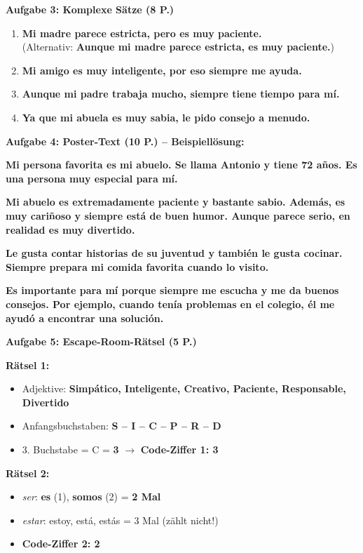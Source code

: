 \documentclass[11pt,a4paper]{article}
\newcommand{\lsg}[1]{\textcolor{loesung}{\textbf{#1}}}
\newcommand{\es}[1]{\textit{#1}}
\begin{document}
\begin{gruppeBbox}
\vspace{0.5em}

\textbf{Aufgabe 3: Komplexe Sätze (8 P.)}
\begin{enumerate}[label=\alph*), leftmargin=2em, nosep]
    \item \lsg{Mi madre parece estricta, pero es muy paciente.} \\
          (Alternativ: \lsg{Aunque mi madre parece estricta, es muy paciente.})
    \item \lsg{Mi amigo es muy inteligente, por eso siempre me ayuda.}
    \item \lsg{Aunque mi padre trabaja mucho, siempre tiene tiempo para mí.}
    \item \lsg{Ya que mi abuela es muy sabia, le pido consejo a menudo.}
\end{enumerate}

\vspace{0.5em}

\textbf{Aufgabe 4: Poster-Text (10 P.) -- Beispiellösung:}

\lsg{Mi persona favorita es mi abuelo. Se llama Antonio y tiene 72 años. Es una persona muy especial para mí.}

\lsg{Mi abuelo es extremadamente paciente y bastante sabio. Además, es muy cariñoso y siempre está de buen humor. Aunque parece serio, en realidad es muy divertido.}

\lsg{Le gusta contar historias de su juventud y también le gusta cocinar. Siempre prepara mi comida favorita cuando lo visito.}

\lsg{Es importante para mí porque siempre me escucha y me da buenos consejos. Por ejemplo, cuando tenía problemas en el colegio, él me ayudó a encontrar una solución.}

\vspace{0.5em}

\textbf{Aufgabe 5: Escape-Room-Rätsel (5 P.)}

\textbf{Rätsel 1:}
\begin{itemize}[leftmargin=1.5em, nosep]
    \item Adjektive: \lsg{Simpático, Inteligente, Creativo, Paciente, Responsable, Divertido}
    \item Anfangsbuchstaben: \lsg{S -- I -- C -- P -- R -- D}
    \item 3. Buchstabe = C = \lsg{3} $\rightarrow$ \textbf{Code-Ziffer 1: \lsg{3}}
\end{itemize}

\textbf{Rätsel 2:}
\begin{itemize}[leftmargin=1.5em, nosep]
    \item \es{ser}: \lsg{es} (1), \lsg{somos} (2) = \textbf{2 Mal}
    \item \es{estar}: estoy, está, estás = 3 Mal (zählt nicht!)
    \item \textbf{Code-Ziffer 2: \lsg{2}}
\end{itemize}


\end{gruppeBbox}
\end{document}

